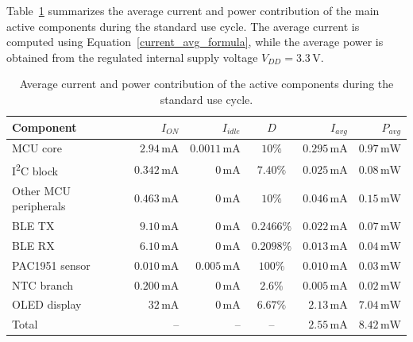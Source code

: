 Table~\ref{tab:active_component_consumption} summarizes the average current and power contribution of the main active components during the standard use cycle. 
The average current is computed using Equation~\ref{current_avg_formula}, while the average power is obtained from the regulated internal supply voltage \(V_{DD}=3.3\,\mathrm{V}\).

\begin{table}[H]
	\centering
	\small
	\setlength{\tabcolsep}{9pt}
	\caption{Average current and power contribution of the active components during the standard use cycle.}
	\label{tab:active_component_consumption}
	\begin{tabular}{@{}l r r c r r@{}}
		\toprule
		\textbf{Component} & \textbf{\(I_{ON}\)} & \textbf{\(I_{idle}\)} & \textbf{\(D\)} & \textbf{\(I_{avg}\)} & \textbf{\(P_{avg}\)} \\
		\midrule
		MCU core &
		\(2.94\,\mathrm{mA}\) &
		\(0.0011\,\mathrm{mA}\) &
		\(10\%\) &
		\(0.295\,\mathrm{mA}\) &
		\(0.97\,\mathrm{mW}\) \\
		
		I\textsuperscript{2}C block &
		\(0.342\,\mathrm{mA}\) &
		\(0\,\mathrm{mA}\) &
		\(7.40\%\) &
		\(0.025\,\mathrm{mA}\) &
		\(0.08\,\mathrm{mW}\) \\
		
		Other MCU peripherals &
		\(0.463\,\mathrm{mA}\) &
		\(0\,\mathrm{mA}\) &
		\(10\%\) &
		\(0.046\,\mathrm{mA}\) &
		\(0.15\,\mathrm{mW}\) \\
		
		BLE TX &
		\(9.10\,\mathrm{mA}\) &
		\(0\,\mathrm{mA}\) &
		\(0.2466\%\) &
		\(0.022\,\mathrm{mA}\) &
		\(0.07\,\mathrm{mW}\) \\
		
		BLE RX &
		\(6.10\,\mathrm{mA}\) &
		\(0\,\mathrm{mA}\) &
		\(0.2098\%\) &
		\(0.013\,\mathrm{mA}\) &
		\(0.04\,\mathrm{mW}\) \\
		
		PAC1951 sensor &
		\(0.010\,\mathrm{mA}\) &
		\(0.005\,\mathrm{mA}\) &
		\(100\%\) &
		\(0.010\,\mathrm{mA}\) &
		\(0.03\,\mathrm{mW}\) \\
		
		NTC branch &
		\(0.200\,\mathrm{mA}\) &
		\(0\,\mathrm{mA}\) &
		\(2.6\%\) &
		\(0.005\,\mathrm{mA}\) &
		\(0.02\,\mathrm{mW}\) \\
		
		OLED display &
		\(32\,\mathrm{mA}\) &
		\(0\,\mathrm{mA}\) &
		\(6.67\%\) &
		\(2.13\,\mathrm{mA}\) &
		\(7.04\,\mathrm{mW}\) \\
		\midrule
		Total &
		-- &
		-- &
		-- &
		\(2.55\,\mathrm{mA}\) &
		\(8.42\,\mathrm{mW}\) \\
		\bottomrule
	\end{tabular}
\end{table}



